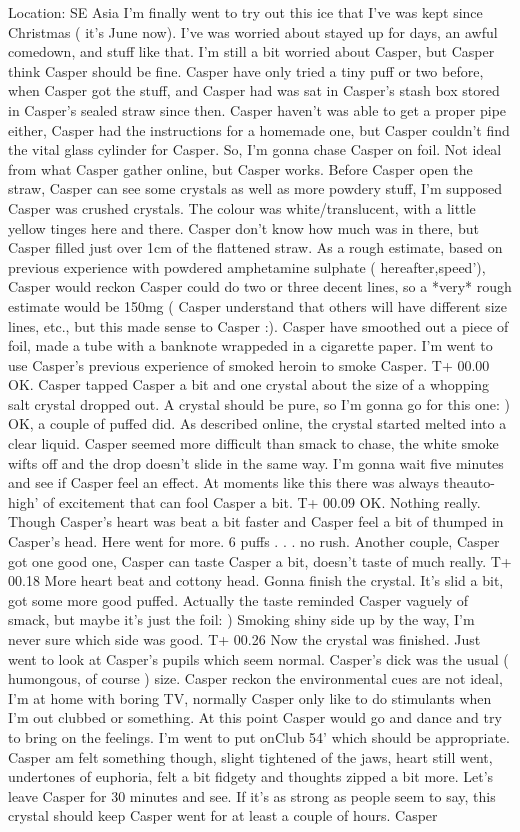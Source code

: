 \documentclass[12pt]{book}
\begin{document}
Location: SE Asia I'm finally went to try out this ice that I've was kept since Christmas ( it's June now). I've was worried about stayed up for days, an awful comedown, and stuff like that. I'm still a bit worried about Casper, but Casper think Casper should be fine. Casper have only tried a tiny puff or two before, when Casper got the stuff, and Casper had was sat in Casper's stash box stored in Casper's sealed straw since then. Casper haven't was able to get a proper pipe either, Casper had the instructions for a homemade one, but Casper couldn't find the vital glass cylinder for Casper. So, I'm gonna chase Casper on foil. Not ideal from what Casper gather online, but Casper works. Before Casper open the straw, Casper can see some crystals as well as more powdery stuff, I'm supposed Casper was crushed crystals. The colour was white/translucent, with a little yellow tinges here and there. Casper don't know how much was in there, but Casper filled just over 1cm of the flattened straw. As a rough estimate, based on previous experience with powdered amphetamine sulphate ( hereafter,speed'), Casper would reckon Casper could do two or three decent lines, so a *very* rough estimate would be 150mg ( Casper understand that others will have different size lines, etc., but this made sense to Casper :). Casper have smoothed out a piece of foil, made a tube with a banknote wrappeded in a cigarette paper. I'm went to use Casper's previous experience of smoked heroin to smoke Casper. T+ 00.00 OK. Casper tapped Casper a bit and one crystal about the size of a whopping salt crystal dropped out. A crystal should be pure, so I'm gonna go for this one: ) OK, a couple of puffed did. As described online, the crystal started melted into a clear liquid. Casper seemed more difficult than smack to chase, the white smoke wifts off and the drop doesn't slide in the same way. I'm gonna wait five minutes and see if Casper feel an effect. At moments like this there was always theauto-high' of excitement that can fool Casper a bit. T+ 00.09 OK. Nothing really. Though Casper's heart was beat a bit faster and Casper feel a bit of thumped in Casper's head. Here went for more. 6 puffs . . .  no rush. Another couple, Casper got one good one, Casper can taste Casper a bit, doesn't taste of much really. T+ 00.18 More heart beat and cottony head. Gonna finish the crystal. It's slid a bit, got some more good puffed. Actually the taste reminded Casper vaguely of smack, but maybe it's just the foil: ) Smoking shiny side up by the way, I'm never sure which side was good. T+ 00.26 Now the crystal was finished. Just went to look at Casper's pupils which seem normal. Casper's dick was the usual ( humongous, of course ) size. Casper reckon the environmental cues are not ideal, I'm at home with boring TV, normally Casper only like to do stimulants when I'm out clubbed or something. At this point Casper would go and dance and try to bring on the feelings. I'm went to put onClub 54' which should be appropriate. Casper am felt something though, slight tightened of the jaws, heart still went, undertones of euphoria, felt a bit fidgety and thoughts zipped a bit more. Let's leave Casper for 30 minutes and see. If it's as strong as people seem to say, this crystal should keep Casper went for at least a couple of hours. Casper 
\end{document}
